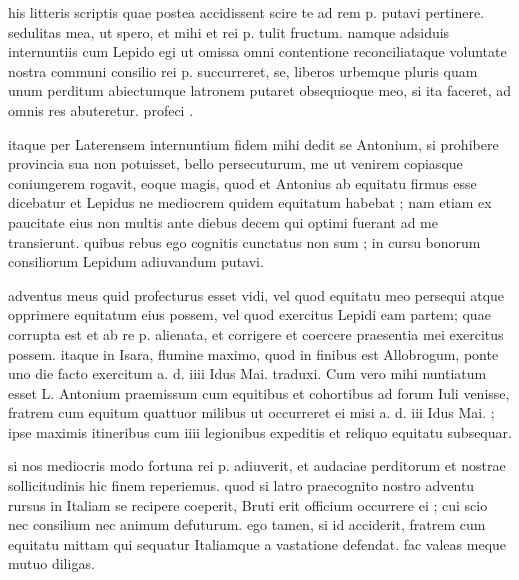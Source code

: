


 his litteris scriptis quae postea accidissent scire te ad rem p. putavi pertinere. sedulitas mea, ut spero, et mihi et rei p. tulit fructum. namque adsiduis internuntiis cum Lepido egi ut omissa omni contentione reconciliataque voluntate nostra communi consilio rei p. succurreret, se, liberos urbemque pluris quam unum perditum abiectumque latronem putaret obsequioque meo, si ita faceret, ad omnis res abuteretur. profeci .

 itaque per Laterensem internuntium fidem mihi dedit se Antonium, si prohibere provincia sua non potuisset, bello persecuturum, me ut venirem copiasque coniungerem rogavit, eoque magis, quod et Antonius ab equitatu firmus esse dicebatur et Lepidus ne mediocrem quidem equitatum habebat ; nam etiam ex paucitate eius non multis ante diebus decem qui optimi fuerant ad me transierunt. quibus rebus ego cognitis cunctatus non sum ; in cursu bonorum consiliorum Lepidum adiuvandum putavi.

 adventus meus quid profecturus esset vidi, vel quod equitatu meo persequi atque opprimere equitatum eius possem, vel quod exercitus Lepidi eam partem; quae corrupta est et ab re p. alienata, et corrigere et coercere praesentia mei exercitus possem. itaque in Isara, flumine maximo, quod in finibus est Allobrogum, ponte uno die facto exercitum a. d. iiii Idus Mai. traduxi. Cum vero mihi nuntiatum esset L. Antonium praemissum cum equitibus et cohortibus ad forum Iuli venisse, fratrem cum equitum quattuor milibus ut occurreret ei misi a. d. iii Idus Mai. ; ipse maximis itineribus cum iiii legionibus expeditis et reliquo equitatu subsequar.

 si nos mediocris modo fortuna rei p. adiuverit, et audaciae perditorum et nostrae sollicitudinis hic finem reperiemus. quod si latro praecognito nostro adventu rursus in Italiam se recipere coeperit, Bruti erit officium occurrere ei ; cui scio nec consilium nec animum defuturum. ego tamen, si id acciderit, fratrem cum equitatu mittam qui sequatur Italiamque a vastatione defendat. fac valeas meque mutuo diligas.
